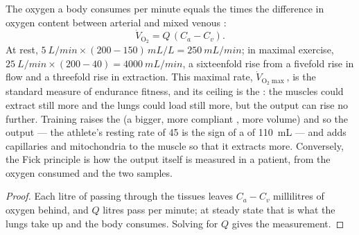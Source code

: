 \begin{theorem}\label{thm:b2:blood-pressure:fick}
The oxygen a body consumes per minute equals the 
times the difference in oxygen content between arterial and mixed
venous :
\[
\dot V_{\mathrm{O_2}} = Q\,(C_a - C_v).
\]
At rest, $\qty{5}{L/min}\times(200 - 150)\,\unit{mL/L} = \qty{250}{mL/min}$;
in maximal exercise, $\qty{25}{L/min}\times(200 - 40) =
\qty{4000}{mL/min}$, a sixteenfold rise from a fivefold rise in flow
and a threefold rise in extraction. This maximal rate,
$\dot V_{\mathrm{O_2}\max}$, is the standard measure of endurance
fitness, and its ceiling is the : the muscles could extract
still more and the lungs could load still more, but the output can
rise no further. Training raises the  (a bigger, more
compliant , more  volume) and so the output --- the
athlete's resting rate of 45 is the sign of a  of
\qty{110}{mL} --- and adds capillaries and mitochondria to the muscle
so that it extracts more. Conversely, the Fick principle is how the
output itself is measured in a patient, from the oxygen consumed and
the two  samples.
\end{theorem}
\begin{proof}
Each litre of  passing through the tissues leaves $C_a - C_v$
millilitres of oxygen behind, and $Q$ litres pass per minute; at
steady state that is what the lungs take up and the body consumes.
Solving for $Q$ gives the measurement.
\end{proof}

